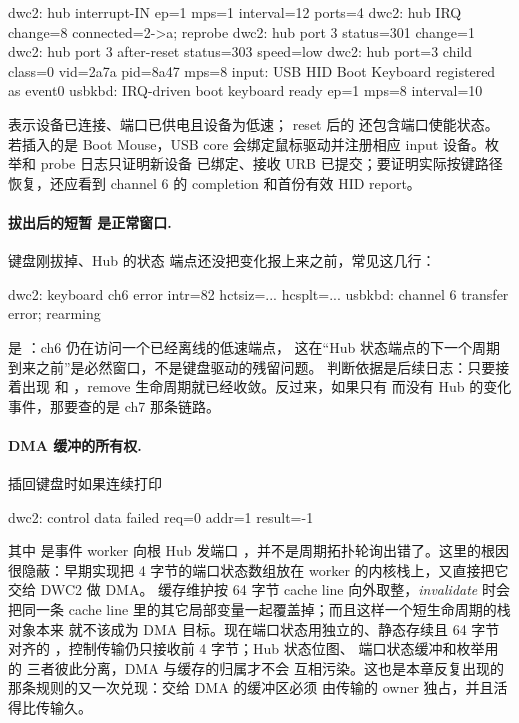 \begin{txtcode}
dwc2: hub interrupt-IN ep=1 mps=1 interval=12 ports=4
dwc2: hub IRQ change=8 connected=2->a; reprobe
dwc2: hub port 3 status=301 change=1
dwc2: hub port 3 after-reset status=303 speed=low
dwc2: hub port=3 child class=0 vid=2a7a pid=8a47 mps=8
input: USB HID Boot Keyboard registered as event0
usbkbd: IRQ-driven boot keyboard ready ep=1 mps=8 interval=10
\end{txtcode}

 表示设备已连接、端口已供电且设备为低速；
reset 后的  还包含端口使能状态。若插入的是 Boot Mouse，USB
core 会绑定鼠标驱动并注册相应 input 设备。枚举和 probe 日志只证明新设备
已绑定、接收 URB 已提交；要证明实际按键路径恢复，还应看到 channel 6 的
completion 和首份有效 HID report。

\paragraph{拔出后的短暂  是正常窗口.} 键盘刚拔掉、Hub 的状态
端点还没把变化报上来之前，常见这几行：

\begin{txtcode}
dwc2: keyboard ch6 error intr=82 hctsiz=... hcsplt=...
usbkbd: channel 6 transfer error; rearming
\end{txtcode}

 是 ：ch6 仍在访问一个已经离线的低速端点，
这在“Hub 状态端点的下一个周期到来之前”是必然窗口，不是键盘驱动的残留问题。
判断依据是后续日志：只要接着出现  和
，remove 生命周期就已经收敛。反过来，如果只有
 而没有 Hub 的变化事件，那要查的是 ch7 那条链路。

\paragraph{DMA 缓冲的所有权.} 插回键盘时如果连续打印

\begin{txtcode}
dwc2: control data failed req=0 addr=1 result=-1
\end{txtcode}

其中  是事件 worker 向根 Hub 发端口
，并不是周期拓扑轮询出错了。这里的根因很隐蔽：早期实现把
4 字节的端口状态数组放在 worker 的内核栈上，又直接把它交给 DWC2 做 DMA。
缓存维护按 64 字节 cache line 向外取整，\emph{invalidate} 时会把同一条
cache line 里的其它局部变量一起覆盖掉；而且这样一个短生命周期的栈对象本来
就不该成为 DMA 目标。现在端口状态用独立的、静态存续且 64 字节对齐的
，控制传输仍只接收前 4 字节；Hub 状态位图、
端口状态缓冲和枚举用的  三者彼此分离，DMA 与缓存的归属才不会
互相污染。这也是本章反复出现的那条规则的又一次兑现：交给 DMA 的缓冲区必须
由传输的 owner 独占，并且活得比传输久。

